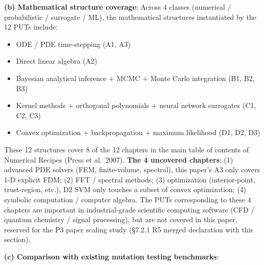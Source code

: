 \documentclass[review,12pt,authoryear]{elsarticle}
\providecommand{\tightlist}{\setlength{\itemsep}{0pt}\setlength{\parskip}{0pt}}
\begin{document}
\textbf{(b) Mathematical structure coverage}: Across 4 classes
(numerical / probabilistic / surrogate / ML), the mathematical
structures instantiated by the 12 PUTs include:

\begin{itemize}
\tightlist
\item
  ODE / PDE time-stepping (A1, A3)
\item
  Direct linear algebra (A2)
\item
  Bayesian analytical inference + MCMC + Monte Carlo integration (B1,
  B2, B3)
\item
  Kernel methods + orthogonal polynomials + neural network surrogates
  (C1, C2, C3)
\item
  Convex optimization + backpropagation + maximum likelihood (D1, D2,
  D3)
\end{itemize}

These 12 structures cover 8 of the 12 chapters in the main table of
contents of Numerical Recipes (Press et al.~2007). \textbf{The 4
uncovered chapters}: (1) advanced PDE solvers (FEM, finite-volume,
spectral), this paper's A3 only covers 1-D explicit FDM; (2) FFT /
spectral methods; (3) optimization (interior-point, trust-region, etc.),
D2 SVM only touches a subset of convex optimization; (4) symbolic
computation / computer algebra. The PUTs corresponding to these 4
chapters are important in industrial-grade scientific computing software
(CFD / quantum chemistry / signal processing), but are not covered in
this paper, reserved for the P3 paper scaling study (§7.2.1 R5 merged
declaration with this section).

\textbf{(c) Comparison with existing mutation testing benchmarks}:
\end{document}
